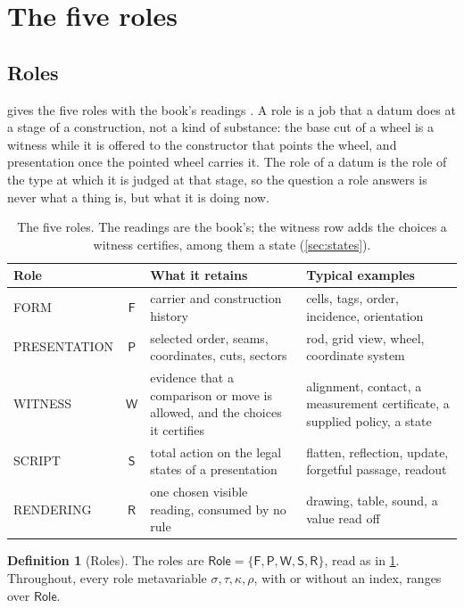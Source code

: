 \documentclass[11pt]{article}
\numberwithin{equation}{section}
\theoremstyle{definition}
\newtheorem{definition}{Definition}[section]
\theoremstyle{plain}
\theoremstyle{remark}
\newcommand{\Role}{\mathsf{Role}}
\newcommand{\Frm}{\mathsf F}
\newcommand{\Prs}{\mathsf P}
\newcommand{\Wit}{\mathsf W}
\newcommand{\Scr}{\mathsf S}
\newcommand{\Ren}{\mathsf R}
\newcommand{\FORM}{\textsf{FORM}}
\newcommand{\PRES}{\textsf{PRESENTATION}}
\newcommand{\WIT}{\textsf{WITNESS}}
\newcommand{\SCR}{\textsf{SCRIPT}}
\newcommand{\REN}{\textsf{RENDERING}}
\begin{document}
\section{The five roles}\label{sec:roles}

\subsection{Roles}\label{sec:role-readings}

 gives the five roles with the book's readings
\cite[\S1.9]{Book}.  A role is a job that a datum does at a stage of a
construction, not a kind of substance: the base cut of a wheel is a witness
while it is offered to the constructor that points the wheel, and
presentation once the pointed wheel carries it.  The role of a datum is the
role of the type at which it is judged at that stage, so the question a role
answers is never what a thing is, but what it is doing now.

\begin{table}[ht]
\centering
\small
\begin{tabularx}{\textwidth}{@{}lc>{\raggedright\arraybackslash}X>{\raggedright\arraybackslash}X@{}}
\toprule
Role & & What it retains & Typical examples\\
\midrule
\FORM & \(\Frm\) & carrier and construction history & cells, tags, order,
incidence, orientation\\
\PRES & \(\Prs\) & selected order, seams, coordinates, cuts, sectors & rod,
grid view, wheel, coordinate system\\
\WIT & \(\Wit\) & evidence that a comparison or move is allowed, and the
choices it certifies & alignment, contact, a measurement certificate, a
supplied policy, a state\\
\SCR & \(\Scr\) & total action on the legal states of a presentation &
flatten, reflection, update, forgetful passage, readout\\
\REN & \(\Ren\) & one chosen visible reading, consumed by no rule & drawing,
table, sound, a value read off\\
\bottomrule
\end{tabularx}
\caption{The five roles.  The readings are the book's; the witness row adds
the choices a witness certifies, among them a state (\cref{sec:states}).}
\label{tab:roles}
\end{table}

\begin{definition}[Roles]\label{def:roles}
The roles are
\(
  \Role=\{\Frm,\Prs,\Wit,\Scr,\Ren\}
\),
read as in \cref{tab:roles}.  Throughout, every role metavariable
\(\sigma,\tau,\kappa,\rho\), with or without an index, ranges over \(\Role\).
\end{definition}
\end{document}
